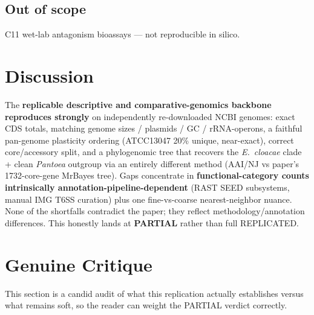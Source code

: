 \documentclass[11pt,letterpaper]{article}
\begin{document}
\subsection{Out of scope}
C11 wet-lab antagonism bioassays --- not reproducible in silico.

\section{Discussion}
The \textbf{replicable descriptive and comparative-genomics backbone reproduces strongly} on independently re-downloaded NCBI genomes: exact CDS totals, matching genome sizes / plasmids / GC / rRNA-operons, a faithful pan-genome plasticity ordering (ATCC13047 20\% unique, near-exact), correct core/accessory split, and a phylogenomic tree that recovers the \textit{E.\ cloacae} clade + clean \textit{Pantoea} outgroup via an entirely different method (AAI/NJ vs paper's 1732-core-gene MrBayes tree). Gaps concentrate in \textbf{functional-category counts intrinsically annotation-pipeline-dependent} (RAST SEED subsystems, manual IMG T6SS curation) plus one fine-vs-coarse nearest-neighbor nuance. None of the shortfalls contradict the paper; they reflect methodology/annotation differences. This honestly lands at \textbf{PARTIAL} rather than full REPLICATED.

\section{Genuine Critique}
This section is a candid audit of what this replication actually establishes versus what remains soft, so the reader can weight the PARTIAL verdict correctly.
\end{document}
